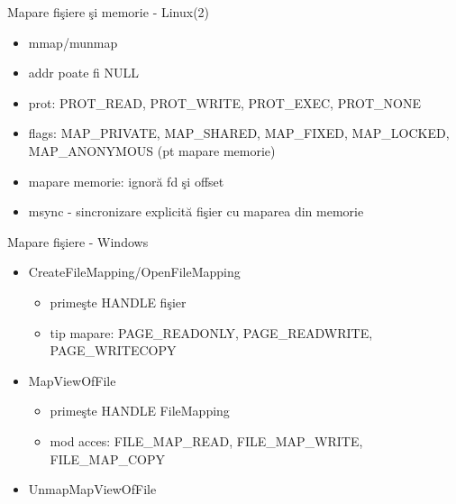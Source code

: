 \documentclass{so.cs.pub.ro}
\begin{document}
\begin{frame}{Mapare fişiere şi memorie - Linux(2)}
\begin{itemize}
  \item mmap/munmap
\end{itemize}
\begin{itemize}
  \item addr poate fi NULL
  \item prot: PROT_READ, PROT_WRITE, PROT_EXEC, PROT_NONE
  \item flags: MAP_PRIVATE, MAP_SHARED, MAP_FIXED, MAP_LOCKED, MAP_ANONYMOUS (pt mapare memorie)
  \item mapare memorie: ignoră fd şi offset
\end{itemize}
\begin{itemize}
  \item msync - sincronizare explicită fişier cu maparea din memorie
\end{itemize}
\end{frame}

\begin{frame}{Mapare fişiere - Windows}
\begin{itemize}
  \item CreateFileMapping/OpenFileMapping
  \begin{itemize}
    \item primeşte HANDLE fişier
    \item tip mapare: PAGE_READONLY, PAGE_READWRITE, PAGE_WRITECOPY
  \end{itemize}
  \vspace{0.3cm}
  \item MapViewOfFile
  \begin{itemize}
    \item primeşte HANDLE FileMapping
    \item mod acces: FILE_MAP_READ, FILE_MAP_WRITE, FILE_MAP_COPY
  \end{itemize}
  \vspace{0.3cm}
  \item UnmapMapViewOfFile
\end{itemize}
\end{frame}
\end{document}
